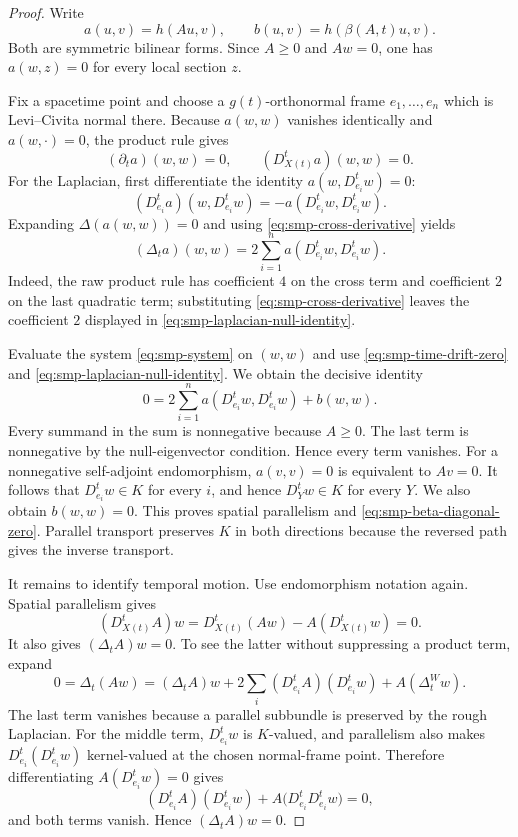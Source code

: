 \documentclass[10pt]{coll-l}
\theoremstyle{definition}
\theoremstyle{remark}
\numberwithin{section}{chapter}
\numberwithin{equation}{chapter}
\begin{document}
\begin{proof}
Write
\[
       a(u,v)=h(Au,v),
       \qquad
       b(u,v)=h(\beta(A,t)u,v).
\]
Both are symmetric bilinear forms.  Since $A\geq0$ and $Aw=0$, one has
$a(w,z)=0$ for every local section $z$.

Fix a spacetime point and choose a $g(t)$-orthonormal frame
$e_1,\ldots,e_n$ which is Levi--Civita normal there.  Because
$a(w,w)$ vanishes identically and $a(w,\cdot)=0$, the product rule gives
\begin{equation}
 (\partial_ta)(w,w)=0,
 \qquad
 (D^t_{X(t)}a)(w,w)=0.                                  \label{eq:smp-time-drift-zero}
\end{equation}
For the Laplacian, first differentiate the identity
$a(w,D^t_{e_i}w)=0$:
\begin{equation}
 (D^t_{e_i}a)(w,D^t_{e_i}w)
   =-a(D^t_{e_i}w,D^t_{e_i}w).                           \label{eq:smp-cross-derivative}
\end{equation}
Expanding $\Delta(a(w,w))=0$ and using
\eqref{eq:smp-cross-derivative} yields
\begin{equation}
 (\Delta_ta)(w,w)
   =2\sum_{i=1}^n a(D^t_{e_i}w,D^t_{e_i}w).              \label{eq:smp-laplacian-null-identity}
\end{equation}
Indeed, the raw product rule has coefficient $4$ on the cross term and
coefficient $2$ on the last quadratic term; substituting
\eqref{eq:smp-cross-derivative} leaves the coefficient $2$ displayed in
\eqref{eq:smp-laplacian-null-identity}.

Evaluate the system \eqref{eq:smp-system} on $(w,w)$ and use
\eqref{eq:smp-time-drift-zero} and
\eqref{eq:smp-laplacian-null-identity}.  We obtain the decisive identity
\begin{equation}
 0
 =2\sum_{i=1}^n a(D^t_{e_i}w,D^t_{e_i}w)+b(w,w).         \label{eq:smp-decisive-kernel-identity}
\end{equation}
Every summand in the sum is nonnegative because $A\geq0$.  The last term
is nonnegative by the null-eigenvector condition.  Hence every term
vanishes.  For a nonnegative self-adjoint endomorphism,
$a(v,v)=0$ is equivalent to $Av=0$.  It follows that
$D^t_{e_i}w\in K$ for every $i$, and hence
$D^t_Yw\in K$ for every $Y$.  We also obtain $b(w,w)=0$.
This proves spatial parallelism and
\eqref{eq:smp-beta-diagonal-zero}.  Parallel transport preserves $K$ in
both directions because the reversed path gives the inverse transport.

It remains to identify temporal motion.  Use endomorphism notation again.
Spatial parallelism gives
\[
 (D^t_{X(t)}A)w
   =D^t_{X(t)}(Aw)-A(D^t_{X(t)}w)=0.
\]
It also gives $(\Delta_tA)w=0$.  To see the latter without suppressing a
product term, expand
\[
 0=\Delta_t(Aw)
   =(\Delta_tA)w
     +2\sum_i(D^t_{e_i}A)(D^t_{e_i}w)
     +A(\Delta_t^Ww).
\]
The last term vanishes because a parallel subbundle is preserved by the
rough Laplacian.  For the middle term, $D^t_{e_i}w$ is $K$-valued, and
parallelism also makes
$D^t_{e_i}(D^t_{e_i}w)$ kernel-valued at the chosen normal-frame point.
Therefore differentiating $A(D^t_{e_i}w)=0$ gives
\[
 (D^t_{e_i}A)(D^t_{e_i}w)
   +A\bigl(D^t_{e_i}D^t_{e_i}w\bigr)=0,
\]
and both terms vanish.  Hence $(\Delta_tA)w=0$.


\end{proof}
\end{document}
